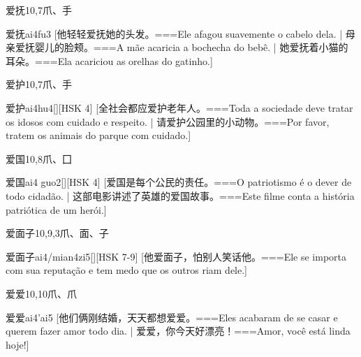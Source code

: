 \begin{Entry}{爱抚}{10,7}{⽖、⼿}
  \begin{Phonetics}{爱抚}{ai4fu3}
    [他轻轻爱抚她的头发。===Ele afagou suavemente o cabelo dela. | 母亲爱抚婴儿的脸颊。===A mãe acaricia a bochecha do bebê. | 她爱抚着小猫的耳朵。===Ela acariciou as orelhas do gatinho.]
  \end{Phonetics}
\end{Entry}

\begin{Entry}{爱护}{10,7}{⽖、⼿}
  \begin{Phonetics}{爱护}{ai4hu4}[][HSK 4]
    [全社会都应爱护老年人。===Toda a sociedade deve tratar os idosos com cuidado e respeito. | 请爱护公园里的小动物。===Por favor, tratem os animais do parque com cuidado.]
  \end{Phonetics}
\end{Entry}

\begin{Entry}{爱国}{10,8}{⽖、⼞}
  \begin{Phonetics}{爱国}{ai4 guo2}[][HSK 4]
    [爱国是每个公民的责任。===O patriotismo é o dever de todo cidadão. | 这部电影讲述了英雄的爱国故事。===Este filme conta a história patriótica de um herói.]
  \end{Phonetics}
\end{Entry}

\begin{Entry}{爱面子}{10,9,3}{⽖、⾯、⼦}
  \begin{Phonetics}{爱面子}{ai4/mian4zi5}[][HSK 7-9]
    [他爱面子，怕别人笑话他。===Ele se importa com sua reputação e tem medo que os outros riam dele.]
  \end{Phonetics}
\end{Entry}

\begin{Entry}{爱爱}{10,10}{⽖、⽖}
  \begin{Phonetics}{爱爱}{ai4'ai5}
    [他们俩刚结婚，天天都想爱爱。===Eles acabaram de se casar e querem fazer amor todo dia. | 爱爱，你今天好漂亮！===Amor, você está linda hoje!]
  \end{Phonetics}
\end{Entry}

